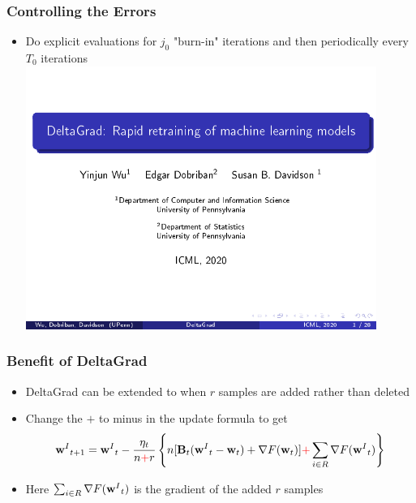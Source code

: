 \documentclass{beamer}
\begin{document}
\begin{frame}
  \frametitle{Controlling the Errors}
  \begin{itemize}
    \item Do explicit evaluations for $j_{0}$ "burn-in" iterations and then periodically every $T_{0}$ iterations
    \includegraphics[page=46,clip,trim=0.5cm 1cm 0cm 1cm,width=0.9\textwidth]{images/Slides.pdf}
  \end{itemize}
\end{frame}

\begin{frame}
  \frametitle{Benefit of DeltaGrad}
  \begin{itemize}
    \item DeltaGrad can be extended to when $r$ samples are added rather than deleted
    \item Change the $+$ to minus in the update formula to get 
    \[
      {\textbf{w}^{I}}_{t+1}  = {\textbf{w}^{I}}_{t} - \frac{\eta_{t}}{n\textcolor{red}{+}r} \left\{ n[\textbf{B}_{t}({\textbf{w}^{I}}_t - \textbf{w}_t) + \nabla F(\textbf{w}_t)] \textcolor{red}{+} \sum_{i\in R} \nabla F({\textbf{w}^{I}}_t)\right\}
    \]
    \item Here $\sum_{i\in R} \nabla F({\textbf{w}^{I}}_t)$ is the gradient of the added $r$ samples
  \end{itemize}
  
\end{frame}
\end{document}
